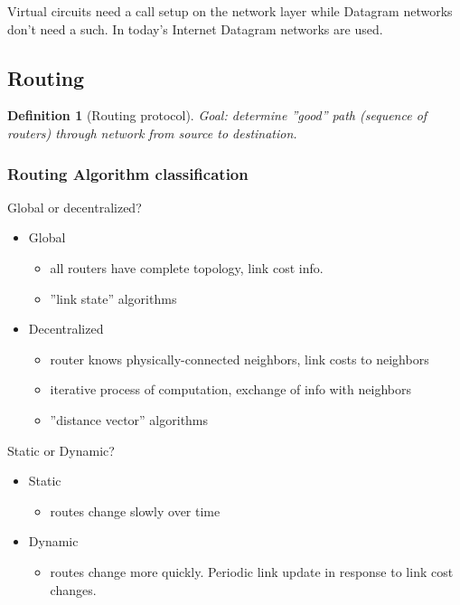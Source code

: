 \documentclass[10pt, a4paper, twocolumn]{scrartcl}
\newtheorem{definition}{Definition}
\begin{document}
Virtual circuits need a call setup on the network layer while Datagram networks don't need a such. In today's Internet Datagram networks are used.

\subsection{Routing}

\begin{definition}[Routing protocol]
	Goal: determine ''good'' path (sequence of routers) through network from source to destination.
\end{definition}

\subsubsection{Routing Algorithm classification}

Global or decentralized?
\begin{itemize}
	\item Global
		\begin{itemize}
			\item all routers have complete topology, link cost info.
			\item ''link state'' algorithms
		\end{itemize}
	\item Decentralized
		\begin{itemize}
			\item router knows physically-connected neighbors, link costs to neighbors
			\item iterative process of computation, exchange of info with neighbors
			\item ''distance vector'' algorithms
		\end{itemize}
\end{itemize}

Static or Dynamic?
\begin{itemize}
	\item Static
		\begin{itemize}
			\item routes change slowly over time
		\end{itemize}
	\item Dynamic
		\begin{itemize}
			\item routes change more quickly. Periodic link update in response to link cost changes. 
		\end{itemize}
\end{itemize}
\end{document}
